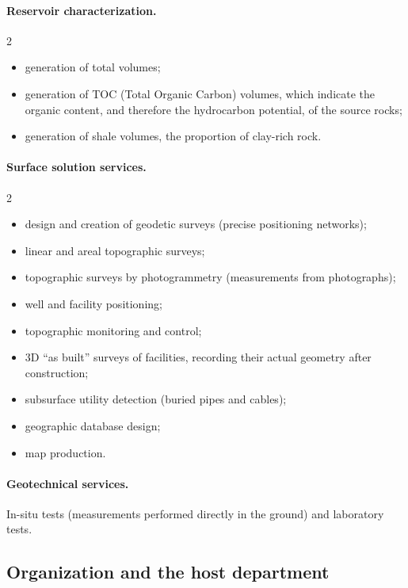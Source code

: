 \documentclass[letterpaper,11pt,leqno]{article}
\begin{document}
\paragraph{Reservoir characterization.}
\begin{multicols}{2}
\begin{itemize}
\item generation of total volumes; %
\item generation of TOC (Total Organic Carbon) volumes, which indicate the
  organic content, and therefore the hydrocarbon potential, of the source rocks;
\item generation of shale volumes, the proportion of clay-rich rock.
\end{itemize}
\end{multicols}

\paragraph{Surface solution services.}
\begin{multicols}{2}
\begin{itemize}
\item design and creation of geodetic surveys (precise positioning networks);
\item linear and areal topographic surveys;
\item topographic surveys by photogrammetry (measurements from photographs);
\item well and facility positioning;
\item topographic monitoring and control;
\item 3D ``as built'' surveys of facilities, recording their actual geometry after
  construction;
\item subsurface utility detection (buried pipes and cables);
\item geographic database design;
\item map production.
\end{itemize}
\end{multicols}

\paragraph{Geotechnical services.} %
In-situ tests (measurements performed directly in the ground) and laboratory tests.

\subsection{Organization and the host department}
\end{document}
